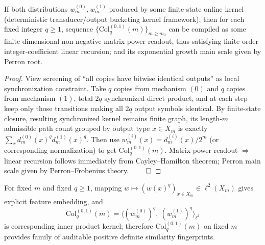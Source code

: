 \begin{proposition}\label{prop:pom-mixed-collision-kernel-computable}
If both distributions \(w_m^{(0)},w_m^{(1)}\) produced by some finite-state online kernel (deterministic transducer/output bucketing kernel framework),
then for each fixed integer \(q\ge 1\), sequence \(\{\mathrm{Col}^{(0,1)}_q(m)\}_{m\ge m_0}\) can be compiled as some finite-dimensional non-negative matrix power readout,
thus satisfying finite-order integer-coefficient linear recursion; and its exponential growth main scale given by Perron root.
\end{proposition}
\begin{proof}
View screening of ``all copies have bitwise identical outputs'' as local synchronization constraint.
Take \(q\) copies from mechanism \((0)\) and \(q\) copies from mechanism \((1)\), total \(2q\) synchronized direct product,
and at each step keep only those transitions making all \(2q\) output symbols identical.
By finite-state closure, resulting synchronized kernel remains finite graph, its length-\(m\) admissible path count grouped by output type \(x\in X_m\) is exactly
\(\sum_x d_m^{(0)}(x)^q d_m^{(1)}(x)^q\).
Then use \(w_m^{(i)}(x)=d_m^{(i)}(x)/2^m\) (or corresponding normalization) to get \(\mathrm{Col}^{(0,1)}_q(m)\).
Matrix power readout \(\Rightarrow\) linear recursion follows immediately from Cayley--Hamilton theorem; Perron main scale given by Perron--Frobenius theory. $\qed$
\end{proof}

\begin{corollary}\label{cor:pom-mixed-collision-pd-kernel}
For fixed \(m\) and fixed \(q\ge 1\), mapping
\(
w\mapsto (w(x)^q)_{x\in X_m}\in \ell^2(X_m)
\)
gives explicit feature embedding, and
\[
\boxed{\;
\mathrm{Col}^{(0,1)}_q(m)
=\big\langle (w_m^{(0)})^q,\ (w_m^{(1)})^q\big\rangle_{\ell^2}\;}
\]
is corresponding inner product kernel; therefore \(\mathrm{Col}^{(0,1)}_q(m)\) on fixed \(m\) provides family of auditable positive definite similarity fingerprints.
\end{corollary}


